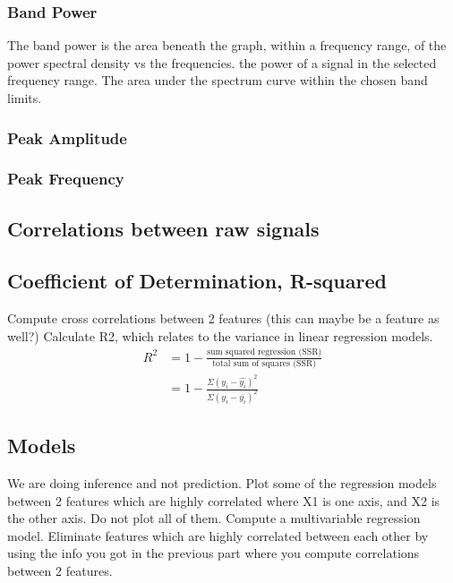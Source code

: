 \documentclass{article}
\begin{document}
\subsubsection{Band Power}
The band power is the area beneath the graph, within a frequency range, of the power spectral density vs the frequencies.
the power of a signal in the selected frequency range.
The area under the spectrum curve within the chosen band limits.
\subsubsection{Peak Amplitude}

\subsubsection{Peak Frequency}

\subsection{Correlations between raw signals}
\subsection{Coefficient of Determination, R-squared}
Compute cross correlations between 2 features (this can maybe be a feature as well?)
Calculate R2, which relates to the variance in linear regression models.
\begin{align*}
 R^2 &= 1 - \frac{\textrm{sum squared regression (SSR)}}{\textrm{total sum of squares (SSR)}} \\ 
 &= 1 - \frac{\Sigma(y_i - \hat{y_i})^2}{\Sigma(y_i - \bar{y_i})^2} 
\end{align*}
\subsection{Models}
We are doing inference and not prediction.
Plot some of the regression models between 2 features which are highly correlated where X1 is one axis, and X2 is the other axis. Do not plot all of them.
Compute a multivariable regression model.
Eliminate features which are highly correlated between each other by using the info you got in the previous part where you compute correlations between 2 features.
\end{document}
